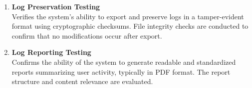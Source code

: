 \begin{enumerate}
    \item \textbf{Log Preservation Testing} \\
    Verifies the system’s ability to export and preserve logs in a tamper-evident format using cryptographic checksums. File integrity checks are conducted to confirm that no modifications occur after export.
    
    \item \textbf{Log Reporting Testing} \\
    Confirms the ability of the system to generate readable and standardized reports summarizing user activity, typically in PDF format. The report structure and content relevance are evaluated.
\end{enumerate}


